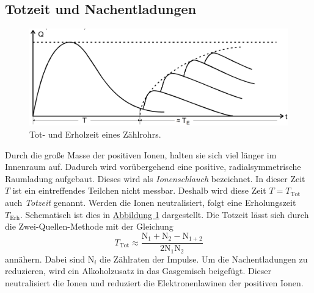 \subsection{Totzeit und Nachentladungen}\label{sec:Nachentladungen}
\begin{figure} [H]
    \center
    \includegraphics[width=0.8\linewidth]{pictures/Diagramm2.pdf}
    \caption{Tot- und Erholzeit eines Zählrohrs.}\label{fig:Diagramm2}
\end{figure}
Durch die große Masse der positiven Ionen, halten sie sich viel länger im Innenraum auf.
Dadurch wird vorübergehend eine positive, radialsymmetrische Raumladung aufgebaut.
Dieses wird als \textit{Ionenschlauch} bezeichnet.
In dieser Zeit $T$ ist ein eintreffendes Teilchen nicht messbar.
Deshalb wird diese Zeit $T = T_\text{Tot}$ auch \textit{Totzeit} genannt.
Werden die Ionen neutralisiert, folgt eine Erholungszeit $T_\text{Erh}$.
Schematisch ist dies in \hyperref[fig:Diagramm2]{Abbildung \ref{fig:Diagramm2}} dargestellt.
Die Totzeit lässt sich durch die Zwei-Quellen-Methode mit der Gleichung
\begin{equation}
    T_\text{Tot} \approx \frac{\text{N}_1 + \text{N}_2 - \text{N}_{1+2}}{2\text{N}_1 \text{N}_2}
\end{equation}
annähern.
Dabei sind $\text{N}_i$ die Zählraten der Impulse.
Um die Nachentladungen zu reduzieren, wird ein Alkoholzusatz in das Gasgemisch beigefügt.
Dieser neutralisiert die Ionen und reduziert die Elektronenlawinen der positiven Ionen.

